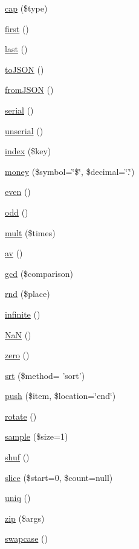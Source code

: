 \begin{DoxyCompactItemize}
\hyperlink{classr_a1a9162d9360cbf8e07359b7801c6ed93}{cap} (\$type)
\item 
\hyperlink{classr_ac73eef9ff76ea330c0dab36ca448b90d}{first} ()
\item 
\hyperlink{classr_ac90cadb327363232bb2d83a4f8ebd613}{last} ()
\item 
\hyperlink{classr_a2108d0f07e9bca6160bf5885703de972}{to\-J\-S\-O\-N} ()
\item 
\hyperlink{classr_ae456068dd57aa56c7fc891a526e67c32}{from\-J\-S\-O\-N} ()
\item 
\hyperlink{classr_a20d848af138f92c4604f0bcecce267e2}{serial} ()
\item 
\hyperlink{classr_a5664dc3d9f1d71ac463a833d37583e84}{unserial} ()
\item 
\hyperlink{classr_ada723c8fc4c1599c3f0a5a73698ef7fd}{index} (\$key)
\item 
\hyperlink{classr_a7755db2baa1c58774d9cf1c5c82676a1}{money} (\$symbol=\char`\"{}\$\char`\"{}, \$decimal=\char`\"{}.\char`\"{})
\item 
\hyperlink{classr_a046b5f5e8b171d4724f2780303239825}{even} ()
\item 
\hyperlink{classr_a666c4ea82d473f0e68ad97e3f33d1e83}{odd} ()
\item 
\hyperlink{classr_a57202f5e3d5e0a89e18aac7d96773cab}{mult} (\$times)
\item 
\hyperlink{classr_ad8c557c876471daa5dce718f01fd77b2}{av} ()
\item 
\hyperlink{classr_a0a13d13bfe0866bab479a700d059898b}{gcd} (\$comparison)
\item 
\hyperlink{classr_ab7cf083b6111db8f56b7d0b42cbba7a0}{rnd} (\$place)
\item 
\hyperlink{classr_a63f86e65e715320e6e292251810cd0b9}{infinite} ()
\item 
\hyperlink{classr_ae27ea99fd73ded7a863a154be23756d3}{Na\-N} ()
\item 
\hyperlink{classr_a75525252dfe9a4b2cc4e31bf066afe1c}{zero} ()
\item 
\hyperlink{classr_a977f683ea39406f1243565b0ee28bd5a}{srt} (\$method= 'sort')
\item 
\hyperlink{classr_a24a0a2d08214aa208efaf13be12b41fe}{push} (\$item, \$location=\char`\"{}end\char`\"{})
\item 
\hyperlink{classr_a74e94d71195d9cbb9c9e3bca3353d912}{rotate} ()
\item 
\hyperlink{classr_ace98c3b631ca27cdb027bbe389ef8628}{sample} (\$size=1)
\item 
\hyperlink{classr_a6595f5d5f838d64df0210138f2cef0bd}{shuf} ()
\item 
\hyperlink{classr_ae01473d9a4d7f2c33c1a157b9cce13f4}{slice} (\$start=0, \$count=null)
\item 
\hyperlink{classr_a032c9d1b1b6ac32627b95225479aa7c0}{uniq} ()
\item 
\hyperlink{classr_a2dba4fd3850e2c373dad4604d170dfa6}{zip} (\$args)
\item 
\hyperlink{classr_a04980c8e9024c09c700fdf68df9d5775}{swapcase} ()
\end{DoxyCompactItemize}
